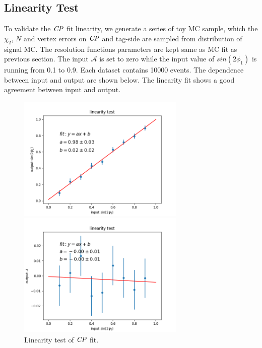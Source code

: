 \subsection{Linearity Test}
To validate the $\it{CP}$ fit linearity, we generate a series of toy MC sample, which the $\chi_2$, $N$ and vertex errors on $\it{CP}$ and tag-side are sampled from distribution of signal MC. The resolution functions parameters are kept same as MC fit as previous section. The input $\mathcal{A}$ is set to zero while the input value of $sin(2\phi_1)$ is running from 0.1 to 0.9. Each dataset contains 10000 events. The dependence between input and output are shown below. The linearity fit shows a good agreement between input and output.

\begin{figure}[H]
	\begin{minipage}{0.5\linewidth}
		\includegraphics[height=6cm]{figures/S-test-line}
	\end{minipage}
	\begin{minipage}{0.5\linewidth}
		\includegraphics[height=6cm]{figures/A-test-line}
	\end{minipage}
	\caption{Linearity test of $\it{CP}$ fit.}
\end{figure}

